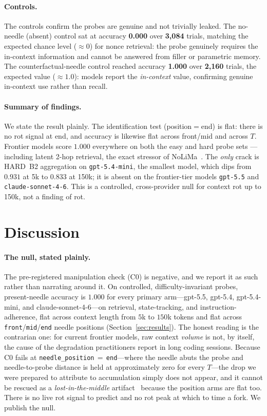 \documentclass[11pt]{article}
\begin{document}
\paragraph{Controls.}
The controls confirm the probes are genuine and not trivially leaked. The
no-needle (absent) control sat at accuracy \textbf{0.000} over \textbf{3{,}084}
trials, matching the expected chance level ($\approx 0$) for nonce retrieval:
the probe genuinely requires the in-context information and cannot be answered
from filler or parametric memory. The counterfactual-needle control reached
accuracy \textbf{1.000} over \textbf{2{,}160} trials, the expected value
($\approx 1.0$): models report the \emph{in-context} value, confirming genuine
in-context use rather than recall.

\paragraph{Summary of findings.}
We state the result plainly. The identification test
(position$=$end) is flat: there is no rot signal at end, and accuracy is
likewise flat across front/mid and across $T$. Frontier models score
$1.000$ everywhere on both the easy and hard probe sets ---
including latent 2-hop retrieval, the exact stressor of
NoLiMa~\cite{modarressi2025nolima}. The \emph{only} crack is HARD~B2
aggregation on \texttt{gpt-5.4-mini}, the smallest model, which dips from
$0.931$ at 5k to $0.833$ at 150k; it is absent on the frontier-tier models
\texttt{gpt-5.5} and \texttt{claude-sonnet-4-6}. This is a controlled,
cross-provider null for context rot up to 150k, not a finding of rot.

\section{Discussion}
\label{sec:discussion}

\paragraph{The null, stated plainly.}
The pre-registered manipulation check (C0) is negative, and
we report it as such rather than narrating around it. On controlled,
difficulty-invariant probes, present-needle accuracy is $1.000$ for every primary
arm---gpt-5.5, gpt-5.4, gpt-5.4-mini, and claude-sonnet-4-6---on retrieval,
state-tracking, and instruction-adherence, flat across context length from $5$k to
$150$k tokens and flat across \texttt{front}/\texttt{mid}/\texttt{end} needle
positions (Section~\ref{sec:results}). The honest reading is the contrarian one: for
current frontier models, raw context \emph{volume} is not, by itself, the cause of
the degradation practitioners report in long coding sessions. Because C0 fails at
\texttt{needle\_position}\,$=$\,\texttt{end}---where the needle abuts the probe and
needle-to-probe distance is held at approximately zero for every $T$---the drop we
were prepared to attribute to accumulation simply does not appear, and it cannot be
rescued as a \emph{lost-in-the-middle} artifact~\cite{liu2024lostmiddle} because the
position arms are flat too. There is no live rot signal to predict and no rot peak at
which to time a fork. We publish the null.
\end{document}
